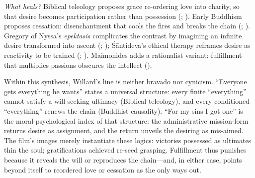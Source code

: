 \emph{What heals?} Biblical teleology proposes grace re-ordering love into charity, so that desire becomes participation rather than possession (\parencite{AugustineCity2003}; ). Early Buddhism proposes cessation: disenchantment that cools the fires and breaks the chain (\parencite{BodhiSN2000}; \parencite{Rahula1959}). Gregory of Nyssa's \emph{epektasis} complicates the contrast by imagining an infinite desire transformed into ascent (\parencite{GregoryMoses1978}; ); Śāntideva’s ethical therapy reframes desire as reactivity to be trained (\parencite{SantidevaBCA1995}; \parencite{Gethin1998}). Maimonides adds a rationalist variant: fulfillment that multiplies passions obscures the intellect ().

Within this synthesis, Willard’s line is neither bravado nor cynicism. ``Everyone gets everything he wants'' states a universal structure: every finite ``everything'' cannot satisfy a will seeking ultimacy (Biblical teleology), and every conditioned ``everything'' renews the chain (Buddhist causality). ``For my sins I got one'' is the moral-psychological index of that structure: the administrative mission-form returns desire as assignment, and the return unveils the desiring as mis-aimed. The film’s images merely instantiate these logics: victories possessed as ultimates thin the soul; gratifications achieved re-seed grasping. Fulfillment thus punishes because it reveals the will or reproduces the chain---and, in either case, points beyond itself to reordered love or cessation as the only ways out.
